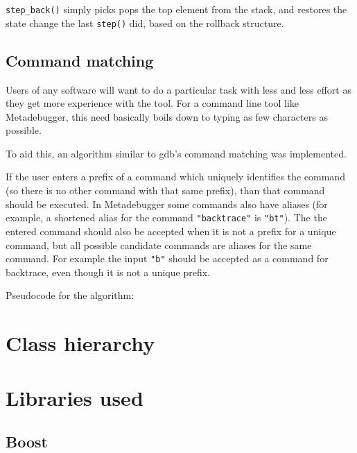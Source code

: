 
\verb$step_back()$ simply picks pops the top element from the stack, and
restores the state change the last \verb$step()$ did, based on the
rollback structure.


\subsection{Command matching}

Users of any software will want to do a particular task with less and less
effort as they get more experience with the tool. For a command line tool like
Metadebugger, this need basically boils down to typing as few characters as
possible.

To aid this, an algorithm similar to gdb's command matching was implemented.

If the user enters a prefix of a command which uniquely identifies the command
(so there is no other command with that same prefix), than that command should
be executed. In Metadebugger some commands also have aliases (for example, a
shortened alias for the command \verb$"backtrace"$ is \verb$"bt"$). The
the entered command should also be accepted when it is not a prefix for a
unique command, but all possible candidate commands are aliases for the same
command. For example the input \verb$"b"$ should be accepted as a command
for backtrace, even though it is not a unique prefix.

Pseudocode for the algorithm:


\section{Class hierarchy}


\section{Libraries used}

\subsection{Boost\cite{boost}}

